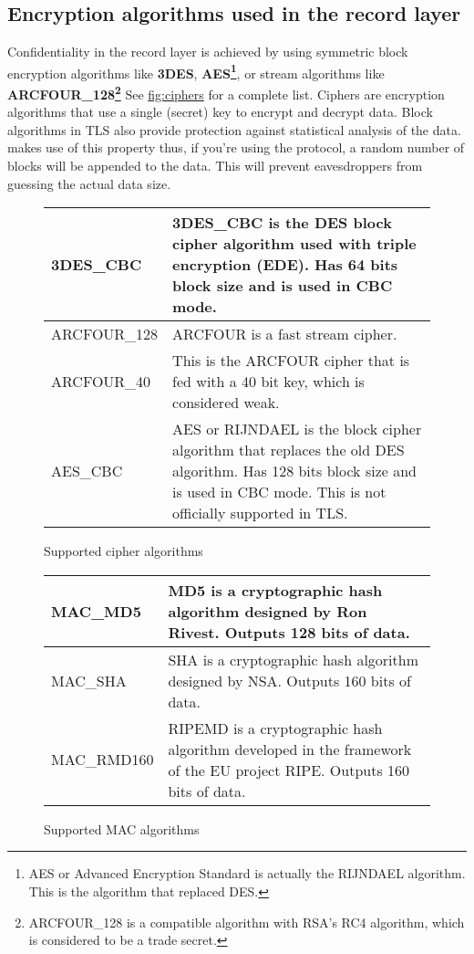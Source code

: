 \subsection*{Encryption algorithms used in the record layer}
Confidentiality in the record layer is achieved by using symmetric block 
encryption algorithms like {\bf 3DES}, {\bf AES\footnote{AES or Advanced 
Encryption Standard is actually the RIJNDAEL algorithm. This is the
algorithm that replaced DES.}}, or
stream algorithms like {\bf ARCFOUR\_128\footnote{ARCFOUR\_128 is a compatible
algorithm with RSA's RC4 algorithm, which is considered to be a trade secret.}} See \hyperref{fig:ciphers}{figure }{}{fig:ciphers} for a complete list. 
Ciphers are encryption algorithms that use a single (secret) key
to encrypt and decrypt data. Block algorithms in TLS also provide protection
against statistical analysis of the data. \gnutls{} makes use of this property
thus, if you're using the \tlsI{} protocol, a random number of blocks will be
appended to the data. This will prevent eavesdroppers from guessing the 
actual data size.

\begin{figure}[hbtp]
\begin{tabular}{|l|p{9cm}|}

\hline
3DES\_CBC & 3DES\_CBC is the DES block cipher algorithm used with triple
encryption (EDE). Has 64 bits block size and is used in CBC mode.
\\
\hline
ARCFOUR\_128 & ARCFOUR is a fast stream cipher.
\\
\hline
ARCFOUR\_40 & This is the ARCFOUR cipher that is fed with a 40 bit key,
which is considered weak.
\\
\hline
AES\_CBC & AES or RIJNDAEL is the block cipher algorithm that replaces 
the old DES algorithm. Has
128 bits block size and is used in CBC mode. This is not officially
supported in TLS.
\\
\hline
\end{tabular}
\caption{Supported cipher algorithms}
\label{fig:ciphers}
\end{figure}



\addvspace{1.5cm}

\begin{figure}[hbtp]
\begin{tabular}{|l|p{9cm}|}

\hline
MAC\_MD5 & MD5 is a cryptographic hash algorithm designed by Ron Rivest. Outputs 128 bits of data.
\\
\hline
MAC\_SHA & SHA is a cryptographic hash algorithm designed by NSA. Outputs 160 bits of data.
\\
\hline
MAC\_RMD160 & RIPEMD is a cryptographic hash algorithm developed in the framework
of the EU project RIPE. Outputs 160 bits of data.
\\
\hline
\end{tabular}
\caption{Supported MAC algorithms}
\label{fig:mac}
\end{figure}

